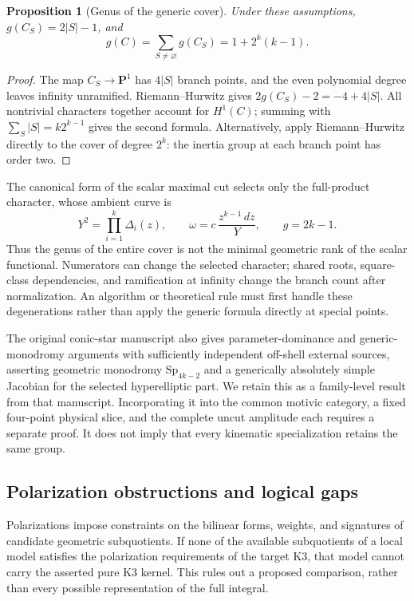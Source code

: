 \documentclass[11pt,a4paper,oneside]{article}
\theoremstyle{plain}
\newtheorem{proposition}[theorem]{Proposition}
\theoremstyle{definition}
\theoremstyle{remark}
\numberwithin{equation}{section}
\begin{document}
\begin{proposition}[Genus of the generic cover]
Under these assumptions, $g(C_S)=2|S|-1$, and
\begin{equation}
 g(C)=\sum_{S\ne\varnothing}g(C_S)=1+2^k(k-1).
\end{equation}
\end{proposition}
\begin{proof}
The map $C_S\to\mathbf P^1$ has $4|S|$ branch points, and the even polynomial degree leaves infinity unramified. Riemann--Hurwitz gives $2g(C_S)-2=-4+4|S|$. All nontrivial characters together account for $H^1(C)$; summing with $\sum_S|S|=k2^{k-1}$ gives the second formula. Alternatively, apply Riemann--Hurwitz directly to the cover of degree $2^k$: the inertia group at each branch point has order two.
\end{proof}

The canonical form of the scalar maximal cut selects only the full-product character, whose ambient curve is
\begin{equation}
 Y^2=\prod_{i=1}^k\Delta_i(z),\qquad
 \omega=c\,\frac{z^{k-1}\,dz}{Y},\qquad g=2k-1.
\end{equation}
Thus the genus of the entire cover is not the minimal geometric rank of the scalar functional. Numerators can change the selected character; shared roots, square-class dependencies, and ramification at infinity change the branch count after normalization. An algorithm or theoretical rule must first handle these degenerations rather than apply the generic formula directly at special points.

The original conic-star manuscript also gives parameter-dominance and generic-monodromy arguments with sufficiently independent off-shell external sources, asserting geometric monodromy $\mathrm{Sp}_{4k-2}$ and a generically absolutely simple Jacobian for the selected hyperelliptic part. We retain this as a family-level result from that manuscript. Incorporating it into the common motivic category, a fixed four-point physical slice, and the complete uncut amplitude each requires a separate proof. It does not imply that every kinematic specialization retains the same group.


\subsection{Polarization obstructions and logical gaps}
Polarizations impose constraints on the bilinear forms, weights, and signatures of candidate geometric subquotients. If none of the available subquotients of a local model satisfies the polarization requirements of the target K3, that model cannot carry the asserted pure K3 kernel. This rules out a proposed comparison, rather than every possible representation of the full integral.
\end{document}
